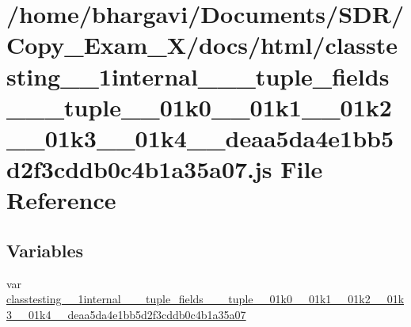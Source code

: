 \hypertarget{classtesting__1__1internal__1__1__tuple__fields__3__01__tuple__00__01k0__00__01k1__00__01k2__00_5fa7472c8be2e319421b1afb5c194166}{}\section{/home/bhargavi/\+Documents/\+S\+D\+R/\+Copy\+\_\+\+Exam\+\_\+X/docs/html/classtesting\+\_\+\_\+1internal\+\_\+\_\+\_\+tuple\+\_\+fields\+\_\+\_\+\_\+tuple\+\_\+\_\+01k0\+\_\+\_\+01k1\+\_\+\_\+01k2\+\_\+\_\+01k3\+\_\+\_\+01k4\+\_\+\_\+deaa5da4e1bb5d2f3cddb0c4b1a35a07.js File Reference}
\label{classtesting__1__1internal__1__1__tuple__fields__3__01__tuple__00__01k0__00__01k1__00__01k2__00_5fa7472c8be2e319421b1afb5c194166}
\subsection*{Variables}
\begin{DoxyCompactItemize}
\item 
var \hyperlink{classtesting__1__1internal__1__1__tuple__fields__3__01__tuple__00__01k0__00__01k1__00__01k2__00_5fa7472c8be2e319421b1afb5c194166_a3c6584dbefc8a629e743b75f536b9867}{classtesting\+\_\+\_\+1internal\+\_\+\_\+\_\+tuple\+\_\+fields\+\_\+\_\+\_\+tuple\+\_\+\_\+01k0\+\_\+\_\+01k1\+\_\+\_\+01k2\+\_\+\_\+01k3\+\_\+\_\+01k4\+\_\+\_\+deaa5da4e1bb5d2f3cddb0c4b1a35a07}
\end{DoxyCompactItemize}


